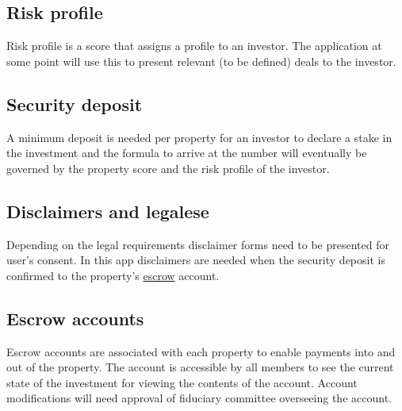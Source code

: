\documentclass{article}
\begin{document}
  \subsection {Risk profile } \label {riskprofile}
  Risk profile is a score that assigns a profile to an investor. The application at some point will use this to present relevant (to be defined) deals to the investor.
  \subsection {Security deposit} \label {securitydeposit}
  A minimum deposit is needed per property for an investor to declare a stake in the investment and the formula to arrive at the number will eventually be governed by the property score and the risk profile of the investor.
  \subsection {Disclaimers and legalese} \label {disclaimerflow}
  Depending on the legal requirements disclaimer forms need to be presented for user's consent. In this app disclaimers are needed when the security deposit is confirmed to the property's \href{escrow}{escrow} account.

  \subsection {Escrow accounts} \label {escrow}
  Escrow accounts are associated with each property to enable payments into and out of the property. The account is accessible by all members to see the current state of the investment for viewing the contents of the account. Account modifications will need approval of fiduciary committee overseeing the account. 
\end{document}
